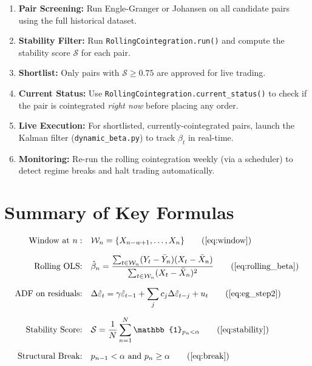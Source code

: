 \documentclass[12pt, a4paper]{article}
\begin{document}
\begin{enumerate}[label=\textbf{Step \arabic*:}]
    \item \textbf{Pair Screening:} Run Engle-Granger or Johansen on all candidate pairs 
          using the full historical dataset.
    \item \textbf{Stability Filter:} Run \texttt{RollingCointegration.run()} and compute 
          the stability score $\mathcal{S}$ for each pair.
    \item \textbf{Shortlist:} Only pairs with $\mathcal{S} \geq 0.75$ are approved for live trading.
    \item \textbf{Current Status:} Use \texttt{RollingCointegration.current\_status()} to check 
          if the pair is cointegrated \emph{right now} before placing any order.
    \item \textbf{Live Execution:} For shortlisted, currently-cointegrated pairs, launch the 
          Kalman filter (\texttt{dynamic\_beta.py}) to track $\beta_t$ in real-time.
    \item \textbf{Monitoring:} Re-run the rolling cointegration weekly (via a scheduler) to 
          detect regime breaks and halt trading automatically.
\end{enumerate}

\section{Summary of Key Formulas}

\begin{align}
    \text{Window at } n:& \quad \mathcal{W}_n = \{X_{n-w+1}, \ldots, X_n\} \tag{\ref{eq:window}} \\[6pt]
    \text{Rolling OLS:}& \quad \hat\beta_n = \frac{\sum_{t \in \mathcal{W}_n}(Y_t - \bar Y_n)(X_t - \bar X_n)}{\sum_{t \in \mathcal{W}_n}(X_t - \bar X_n)^2} \tag{\ref{eq:rolling_beta}} \\[6pt]
    \text{ADF on residuals:}& \quad \Delta\hat\varepsilon_t = \gamma \hat\varepsilon_{t-1} + \sum_j c_j \Delta\hat\varepsilon_{t-j} + u_t \tag{\ref{eq:eg_step2}} \\[6pt]
    \text{Stability Score:}& \quad \mathcal{S} = \frac{1}{N}\sum_{n=1}^N \mathbb{1}_{p_n < \alpha} \tag{\ref{eq:stability}} \\[6pt]
    \text{Structural Break:}& \quad p_{n-1} < \alpha \text{ and } p_n \geq \alpha \tag{\ref{eq:break}}
\end{align}
\end{document}
